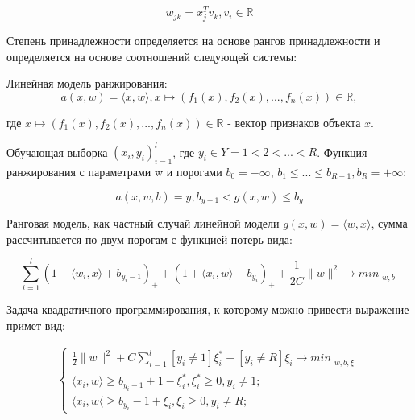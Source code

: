 \documentclass[review]{elsarticle}
\begin{document}
\begin{equation}
    \label{eq:equation_wight}
    w_{jk} = x_{j}^{T}v_{k}, v_{i} \in \mathbb{R}
\end{equation}



Степень принадлежности определяется на основе рангов принадлежности и определяется на основе соотношений следующей системы:



Линейная модель ранжирования:
\begin{equation}
    \label{eq:equation_linear}
    a(x,w) = \langle x, w \rangle, x \mapsto (f_{1}(x), f_{2}(x), ..., f_{n}(x)) \in \mathbb{R},
\end{equation}

где $x \mapsto (f_{1}(x), f_{2}(x), ..., f_{n}(x)) \in \mathbb{R}$ - вектор признаков объекта $x$.

Обучающая выборка $(x_{i}, y_{i})^l_{i=1}$, где $y_{i} \in Y = {1<2<...<R}$. Функция ранжирования с параметрами w и порогами $b_0 = -\infty$, $b_{1} \leq ... \leq b_{R-1}, b_{R} = +\infty$:

\begin{equation}
    \label{eq:equation_rank_function}
    a(x,w,b) = y, b_{y-1} < g(x,w) \leq b_{y}
\end{equation}

Ранговая модель, как частный случай линейной модели $g(x,w) = \langle w, x\rangle $, сумма рассчитывается по двум порогам с функцией потерь вида:

\begin{equation}
    \label{eq:equation_loss_function3}
    \sum_{i=1}^{l}(1 - \langle w_{i}, x \rangle + b_{y_{i} - 1})_{+} + (1 + \langle x_{i}, w \rangle - b_{y_i})_{+} + \frac{1}{2C}\| w \|^2  \rightarrow min_{\substack{w,b}} 
\end{equation}

Задача квадратичного программирования, к которому можно привести выражение примет вид:

\begin{equation}
\label{eq:equation_loss_function4}
\begin{alignedat}{2}
\left\{
\begin{array}{rl}
    \frac{1}{2}\|w\|^2 + C \sum_{i=1}^{l}[y_i \neq 1]  \xi^{*}_{i} + [y_{i} \neq R]\xi_{i} \rightarrow min_{\substack{w,b,\xi}} \\
    \langle x_{i}, w \rangle \geq b_{y_{i} - 1} + 1 - \xi^{*}_{i}, \xi^{*}_{i} \geq 0, y_{i} \neq 1 ; \\
    \langle x_{i}, w \langle \geq b_{y_{i}} - 1 + \xi_{i}, \xi_{i} \geq 0, y_{i} \neq R ;
\end{array}
\right.
\end{alignedat}
\end{equation}
\end{document}
